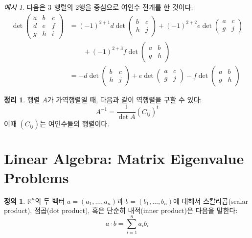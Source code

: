 \documentclass[unfonts,oneside,a4paper]{oblivoir}
\theoremstyle{definition}
\newtheorem{definition}{정의}[section]
\theoremstyle{theorem}
\newtheorem{theorem}{정리}[section]
\theoremstyle{theorem}
\theoremstyle{remark}
\theoremstyle{remark}
\theoremstyle{remark}
\newtheorem*{example}{예시}
\theoremstyle{remark}
\renewcommand{\vec}[1]{\bm{\mathit{#1}}}
\begin{document}
\begin{example}
    다음은 $3 \time 3$ 행렬의 2행을 중심으로 여인수 전개를 한 것이다:
    \begin{align*}
        \det
        \begin{pmatrix}
            a & b & c\\
            d & e & f\\
            g & h & i
        \end{pmatrix}
        &= (-1)^{2 + 1} d \det
        \begin{pmatrix}
            b & c\\
            h & j
        \end{pmatrix}
        + (-1)^{2 + 2} e \det
        \begin{pmatrix}
            a & c\\
            g & j
        \end{pmatrix}\\
        &\qquad+ (-1)^{2 + 3} f \det
        \begin{pmatrix}
            a & b\\
            g & h
        \end{pmatrix}\\
        &= -d \det
        \begin{pmatrix}
            b & c\\
            h & j
        \end{pmatrix}
        + e \det
        \begin{pmatrix}
            a & c\\
            g & j
        \end{pmatrix}
        -f \det
        \begin{pmatrix}
            a & b\\
            g & h
        \end{pmatrix}
    \end{align*}
\end{example}

\begin{theorem}
    행렬 $A$가 가역행렬일 때, 다음과 같이 역행렬을 구할 수 있다:
    \begin{equation*}
        A^{-1} = \frac{1}{\det A} (C_{ij})^t
    \end{equation*}
    이때 $(C_{ij})$는 여인수들의 행렬이다.
\end{theorem}

\section{Linear Algebra: Matrix Eigenvalue Problems}
\begin{definition}
    $\mathbb R^n$의 두 벡터 $\vec a = (a_1, \dots, a_n)$과 $\vec b = (b_1, \dots, b_n)$에 대해서 스칼라곱(scalar product), 점곱(dot product), 혹은 단순히 내적(inner product)은 다음을 말한다:
    \begin{equation*}
        \vec a \cdot \vec b = \sum_{i = 1}^n a_i b_i
    \end{equation*}
\end{definition}
\end{document}
